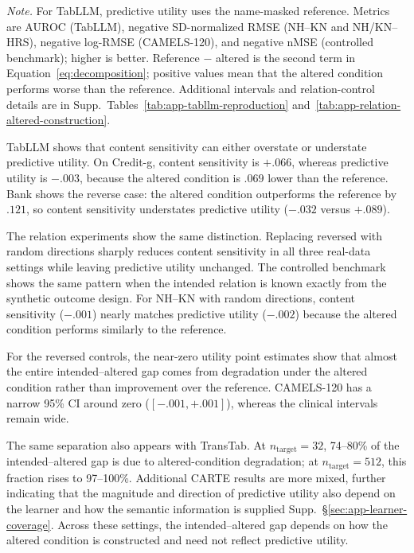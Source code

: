 \documentclass{article} %
\newcommand{\supp}[1]{\textnormal{Supp.~#1}}
\begin{document}
\begin{table}[h]
\noindent
\begin{minipage}{\linewidth}
\fontsize{8pt}{9pt}\selectfont
\emph{Note.}
For TabLLM, predictive utility uses the name-masked reference.
Metrics are AUROC (TabLLM), negative SD-normalized RMSE (NH--KN and NH/KN--HRS), negative log-RMSE (CAMELS-120), and negative nMSE (controlled benchmark); higher is better.
Reference $-$ altered is the second term in Equation~\ref{eq:decomposition}; positive values mean that the altered condition performs worse than the reference.
Additional intervals and relation-control details are in \supp{Tables~\ref{tab:app-tabllm-reproduction} and~\ref{tab:app-relation-altered-construction}}.
\end{minipage}

\end{table}

TabLLM shows that content sensitivity can either overstate or understate predictive utility. 
On Credit-g, content sensitivity is $+.066$, whereas predictive utility is $-.003$, because the altered condition is $.069$ lower than the reference.
Bank shows the reverse case: the altered condition outperforms the reference by $.121$, so content sensitivity understates predictive utility ($-.032$ versus $+.089$).

The relation experiments show the same distinction.
Replacing reversed with random directions sharply reduces content sensitivity in all three real-data settings while leaving predictive utility unchanged.
The controlled benchmark shows the same pattern when the intended relation is known exactly from the synthetic outcome design.
For NH--KN with random directions, content sensitivity ($-.001$) nearly matches predictive utility ($-.002$) because the altered condition performs similarly to the reference.

For the reversed controls, the near-zero utility point estimates show that almost the entire intended--altered gap comes from degradation under the altered condition rather than improvement over the reference.
CAMELS-120 has a narrow 95\% CI around zero ($[-.001,+.001]$), whereas the clinical intervals remain wide.

The same separation also appears with TransTab. 
At $n_{\mathrm{target}}=32$, 74--80\% of the intended--altered gap is due to altered-condition degradation; at $n_{\mathrm{target}}=512$, this fraction rises to 97--100\%.
Additional CARTE results are more mixed, further indicating that the magnitude and direction of predictive utility also depend on the learner and how the semantic information is supplied \supp{\S\ref{sec:app-learner-coverage}}.
Across these settings, the intended--altered gap depends on how the altered condition is constructed and need not reflect predictive utility.
\end{document}
